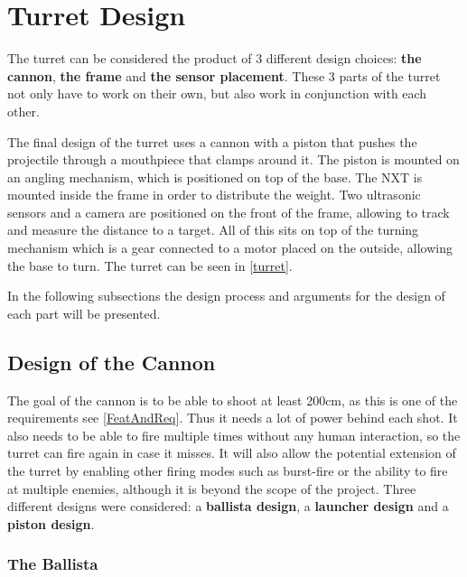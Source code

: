 \section{Turret Design}
The turret can be considered the product of 3 different design choices:
\textbf{the cannon}, \textbf{the frame} and \textbf{the sensor placement}. These
3 parts of the turret not only have to work on their own, but also work in conjunction with
each other.\nl

The final design of the turret uses a cannon with a piston that pushes the
projectile through a mouthpiece that clamps around it. The piston is mounted on
an angling mechanism, which is positioned on top of the base. The NXT is mounted
inside the frame in order to distribute the weight. Two ultrasonic sensors and a
camera are positioned on the front of the frame, allowing \name to track and
measure the distance to a target. All of this sits on top of the turning
mechanism which is a gear connected to a motor placed on the outside, allowing
the base to turn. The turret can be seen in \autoref{turret}.


In the following subsections the design process and arguments for the
design of each part will be presented.

\subsection{Design of the Cannon}
The goal of the cannon is to be able to shoot at least 200cm, as this is one of
the requirements see \autoref{FeatAndReq}. Thus it needs a lot of power behind
each shot. It also needs to be able to fire multiple times without any human
interaction, so the turret can fire again in case it misses. It will also allow
the potential extension of the turret by enabling other firing modes such as
burst-fire or the ability to fire at multiple enemies, although it is beyond the
scope of the project. Three different designs were considered: a
\textbf{ballista design}, a \textbf{launcher design} and a \textbf{piston
design}.


\subsubsection{The Ballista}

